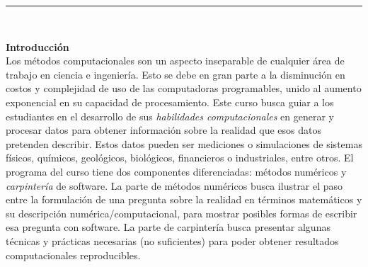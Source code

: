\documentclass[letterpaper,10pt,onecolumn]{article}
\begin{document}





\noindent\rule{\textwidth}{1pt}\\[-0.1cm]

\addtocounter{mysection}{1}

\noindent\textbf{\large {} \quad Introducci\'on}\\[-0.2cm]


\noindent\normalsize Los m\'etodos computacionales son un aspecto
inseparable de cualquier \'area de trabajo en ciencia e ingenier\'ia.
Esto se debe en gran parte a la disminuci\'on en costos y complejidad
de uso de las computadoras programables, unido al aumento
exponencial en su capacidad de procesamiento.
Este curso busca guiar a los estudiantes en el desarrollo de sus
\emph{habilidades computacionales} en generar y procesar
datos para obtener informaci\'on sobre la realidad que esos datos
pretenden  describir.  
Estos datos pueden ser mediciones o simulaciones de
sistemas f\'isicos, qu\'imicos, geol\'ogicos, biol\'ogicos,
financieros o industriales, entre otros.     
El programa del curso tiene dos componentes diferenciadas: m\'etodos
num\'ericos  y \emph{carpinter\'ia} de software.  
La parte de m\'etodos num\'ericos busca ilustrar el paso entre la
formulaci\'on de una pregunta sobre la realidad en t\'erminos
matem\'aticos y su descripci\'on num\'erica/computacional, para
mostrar posibles formas de escribir esa pregunta con software.   
La parte de carpinter\'ia busca presentar algunas t\'ecnicas y
pr\'acticas necesarias (no suficientes) para poder obtener resultados
computacionales reproducibles.   
\\[0.1cm] 
\end{document}
